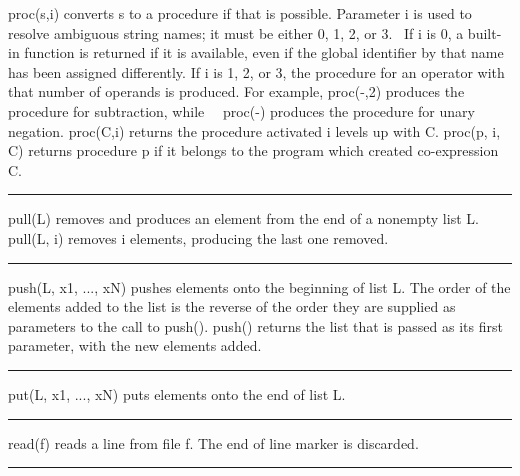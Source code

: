 \noindent
{}\textsf{proc(s,i)} converts \textsf{s} to a procedure
if that is possible. Parameter \textsf{i} is used to resolve ambiguous
string names; it must be either 0, 1, 2, or 3. \ If \textsf{i} is 0, a
built-in function is returned if it is available, even if the global
identifier by that name has been assigned differently. If \textsf{i} is
1, 2, or 3, the procedure for an operator with that number of operands
is produced. For example,
\textsf{proc({\textquotedbl}-{\textquotedbl},2)} produces the procedure
for subtraction, while
\ \ \textsf{proc({\textquotedbl}-{\textquotedbl})} produces the
procedure for unary negation. \textsf{proc(C,i)} returns the procedure
activated \textsf{i} levels up with \textsf{C}. \textsf{proc(p, i, C)}
returns procedure \textsf{p} if it belongs to the program which created
co-expression \textsf{C}.

\bigskip\hrule\vspace{0.1cm}

\noindent
{}\textsf{pull(L)} removes and produces an element from the
end of a nonempty list \textsf{L.} \textsf{pull(L, i)} removes
\textsf{i} elements, producing the last one removed.

\bigskip\hrule\vspace{0.1cm}

\noindent
\textsf{push(L, x1, ..., xN)} pushes elements onto the beginning of list
\textsf{L}. The order of the elements added to the list is the reverse
of the order they are supplied as parameters to the call to
\textsf{push()}. \textsf{push()} returns the list that is
passed as its first parameter, with the new elements added.

\hrule\vspace{0.1cm}

\noindent
{}\textsf{put(L, x1, ..., xN)} puts elements onto the end of
list \textsf{L}.

\bigskip\hrule\vspace{0.1cm}

\noindent
{}\textsf{read(f)} reads a line from file \textsf{f}. The
end of line marker is discarded.

\bigskip\hrule\vspace{0.1cm}


